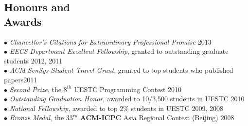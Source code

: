 \documentclass[margin, centered]{resume}
\begin{document}
\begin{resume}
    \section{\mysidestyle Honours and\\Awards} 

    $\bullet$ \textsl{Chancellor's Citations for Extraordinary Professional Promise} \hfill 2013 \\
    $\bullet$ \textsl{EECS Department Excellent Fellowship}, granted to outstanding graduate students \hfill 2012, 2011\vspace{0mm}\\%
    $\bullet$ \textsl{ACM SenSys Student Travel Grant}, granted to top students who published papers\hfill 2011\vspace{0mm}\\%
    $\bullet$ \textsl{Second Prize}, the $8^{th}$ UESTC Programming Contest \hfill 2010\vspace{0mm}\\%
    $\bullet$ \textsl{Outstanding Graduation Honor}, awarded to 10/3,500 students in UESTC \hfill 2010\vspace{0mm}\\%
    $\bullet$ \textsl{National Fellowship}, awarded to top 2\% students in UESTC \hfill 2009, 2008\vspace{0mm}\\%
    $\bullet$ \textsl{Bronze Medal}, the $33^{rd}$ \textbf{ACM-ICPC} Asia Regional Contest (Beijing) \hfill 2008\vspace{-5mm}\\ 




\end{resume}
\end{document}
